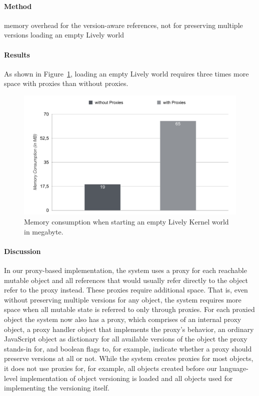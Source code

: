 

\paragraph{Method}
memory overhead for the version-aware references, not for preserving multiple versions
loading an empty Lively world


\paragraph{Results}
As shown in Figure~\ref{fig:MemoryOverhead}, loading an empty Lively world requires three times more space with proxies than without proxies.

\begin{figure}[h]
    \centering
    \includegraphics[width=\textwidth]{figures/6_evaluation/1_memoryOverhead.pdf}
    \caption{Memory consumption when starting an empty Lively Kernel world in megabyte.}
    \label{fig:MemoryOverhead}
\end{figure}

\paragraph{Discussion}
In our proxy-based implementation, the system uses a proxy for each reachable mutable object and all references that would usually refer directly to the object refer to the proxy instead.
These proxies require additional space.
That is, even without preserving multiple versions for any object, the system requires more space when all mutable state is referred to only through proxies.
For each proxied object the system now also has a proxy, which comprises of an internal proxy object, a proxy handler object that implements the proxy's behavior, an ordinary JavaScript object as dictionary for all available versions of the object the proxy stands-in for, and boolean flags to, for example, indicate whether a proxy should preserve versions at all or not.
While the system creates proxies for most objects, it does not use proxies for, for example, all objects created before our language-level implementation of object versioning is loaded and all objects used for implementing the versioning itself.





